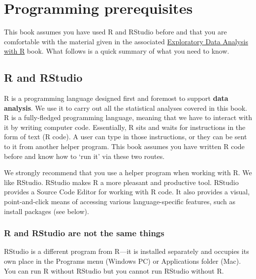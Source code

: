 \documentclass[
]{book}
\newenvironment{greybox}{
  \definecolor{shadecolor}{rgb}{0.95,0.95,0.95}  %
  \color{black}
  \begin{shaded}}
 {\end{shaded}}
\newenvironment{infobox}[1]
  {
  \begin{itemize}
  \renewcommand{\labelitemi}{
    \raisebox{-.7\height}[0pt][0pt]{
      {\setkeys{Gin}{width=3em,keepaspectratio}
        \texttt{[image: images/\#1]}}
    }
  }
  \setlength{\fboxsep}{1em}
  \begin{greybox}
  \item
  }
  {
  \end{greybox}
  \end{itemize}
  }
\begin{document}
\hypertarget{programming-prerequisites}{%
\section*{Programming prerequisites}\label{programming-prerequisites}}

This book assumes you have used R and RStudio before and that you are comfortable with the material given in the associated \href{https://tuos-bio-data-skills.github.io/intro-eda-book/}{Exploratory Data Analysis with R} book. What follows is a quick summary of what you need to know.

\hypertarget{r-and-rstudio}{%
\subsection*{R and RStudio}\label{r-and-rstudio}}

R is a programming language designed first and foremost to support \textbf{data analysis}. We use it to carry out all the statistical analyses covered in this book. R is a fully-fledged programming language, meaning that we have to interact with it by writing computer code. Essentially, R sits and waits for instructions in the form of text (R code). A user can type in those instructions, or they can be sent to it from another helper program. This book assumes you have written R code before and know how to `run it' via these two routes.

We strongly recommend that you use a helper program when working with R. We like RStudio. RStudio makes R a more pleasant and productive tool. RStudio provides a Source Code Editor for working with R code. It also provides a visual, point-and-click means of accessing various language-specific features, such as install packages (see below).

\begin{infobox}{warning}

\hypertarget{r-and-rstudio-are-not-the-same-things}{%
\subsubsection*{R and RStudio are not the same things}\label{r-and-rstudio-are-not-the-same-things}}

RStudio is a different program from R---it is installed separately and occupies its own place in the Programs menu (Windows PC) or Applications folder (Mac). You can run R without RStudio but you cannot run RStudio without R.

\end{infobox}
\end{document}
